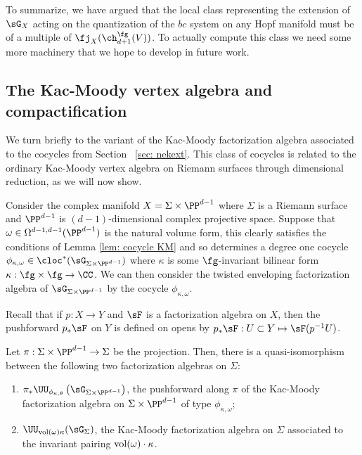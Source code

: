 To summarize, we have argued that the local class representing the extension of $\sG_X$ acting on the quantization of the $bc$ system on any Hopf manifold must be of a multiple of $\fj_X(\ch_{d+1}^\fg(V))$. 
To actually compute this class we need some more machinery that we hope to develop in future work. 

\subsection{The Kac-Moody vertex algebra and compactification} 

We turn briefly to the variant of the Kac-Moody factorization algebra associated to the cocycles from Section ~\ref{sec: nekext}.
This class of cocycles is related to the ordinary Kac-Moody vertex algebra on Riemann surfaces through dimensional reduction, as we will now show. 

Consider the complex manifold $X = \Sigma \times \PP^{d-1}$ where $\Sigma$ is a Riemann surface and $\PP^{d-1}$ is $(d-1)$-dimensional complex projective space.
Suppose that $\omega \in \Omega^{d-1,d-1}(\PP^{d-1})$ is the natural volume form, this clearly satisfies the conditions of Lemma \ref{lem: cocycle KM} and so determines a degree one cocycle $\phi_{\kappa, \omega} \in \cloc^*(\sG_{\Sigma \times \PP^{d-1}})$ where $\kappa$ is some $\fg$-invariant bilinear form $\kappa : \fg \times \fg \to \CC$. 
We can then consider the twisted enveloping factorization algebra of $\sG_{\Sigma \times \PP^{d-1}}$ by the cocycle $\phi_{\kappa, \omega}$. 

Recall that if $p : X \to Y$ and $\sF$ is a factorization algebra on $X$, then the pushforward $p_* \sF$ on $Y$ is defined on opens by $p_* \sF : U \subset Y \mapsto \sF(p^{-1} U)$. 

\begin{prop}
Let $\pi : \Sigma \times \PP^{d-1} \to \Sigma$ be the projection. 
Then, there is a quasi-isomorphism between the following two factorization algebras on $\Sigma$:
\begin{enumerate}
\item $\pi_* \UU_{\phi_{\kappa, \theta}} \left(\sG_{\Sigma \times \PP^{d-1}}\right)$, the pushforward along $\pi$ of the Kac-Moody factorization algebra on $\Sigma \times \PP^{d-1}$ of type $\phi_{\kappa,\omega}$;
\item $\UU_{{\rm vol}(\omega) \kappa} (\sG_\Sigma)$, the Kac-Moody factorization algebra on $\Sigma$ associated to the invariant pairing ${\rm vol}(\omega) \cdot \kappa$. 
\end{enumerate}
\end{prop}

